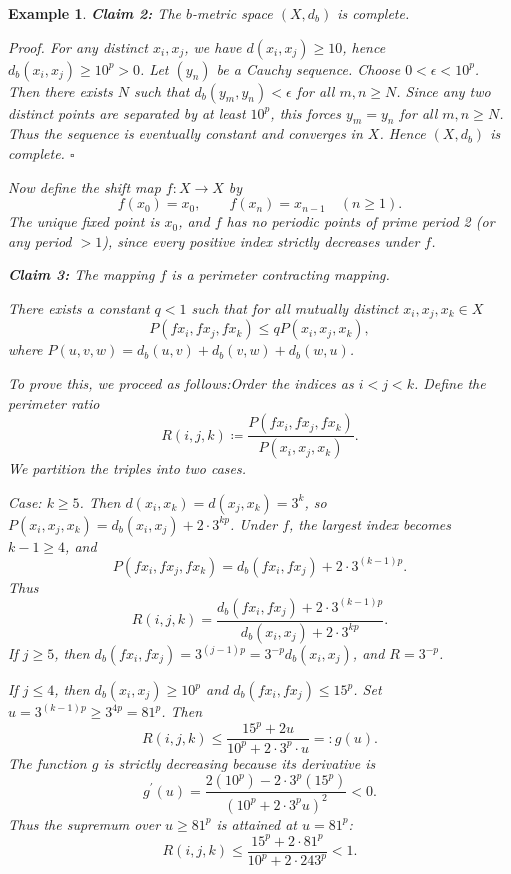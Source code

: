 \documentclass[a4paper,12pt,oneside]{article}
\newtheorem{example}[theorem]{Example}
\numberwithin{equation}{section}
\begin{document}
\begin{example}
\noindent\textbf{Claim 2:} The $b$-metric space $(X,d_{b})$ is complete.

\textit{Proof.} For any distinct $x_{i},x_{j}$, we have $d(x_{i},x_{j})\geq 10$, hence $d_{b}(x_{i},x_{j})\geq 10^{p} > 0$. Let $(y_{n})$ be a Cauchy sequence. Choose $0< \epsilon < 10^{p}$. Then there exists $N$ such that $d_{b}(y_{m},y_{n})< \epsilon$ for all $m,n\geq N$. Since any two distinct points are separated by at least $10^{p}$, this forces $y_{m} = y_{n}$ for all $m,n\geq N$. Thus the sequence is eventually constant and converges in $X$. Hence $(X,d_{b})$ is complete. $\square$

Now define the shift map $f:X\to X$ by
\[
f(x_0) = x_0,\qquad f(x_n) = x_{n - 1}\quad (n\geq 1).
\]
The unique fixed point is $x_{0}$, and $f$ has no periodic points of prime period 2 (or any period $>1$), since every positive index strictly decreases under $f$.

\noindent\textbf{Claim 3:} The mapping $f$ is a perimeter contracting mapping.

There exists a constant $q<1$ such that for all mutually distinct $x_{i},x_{j},x_{k}\in X$
\[
P(fx_{i},fx_{j},fx_{k})\leq qP(x_{i},x_{j},x_{k}),
\]
where $P(u,v,w) = d_{b}(u,v) + d_{b}(v,w) + d_{b}(w,u)$.

To prove this, we proceed as follows:\newline Order the indices as $i< j< k$. Define the perimeter ratio
\[
R(i,j,k)\coloneqq \frac{P(fx_{i},fx_{j},fx_{k})}{P(x_{i},x_{j},x_{k})}.
\]
We partition the triples into two cases.

Case: $k\geq 5$. Then $d(x_{i},x_{k}) = d(x_{j},x_{k}) = 3^{k}$, so $P(x_{i},x_{j},x_{k}) = d_{b}(x_{i},x_{j}) + 2\cdot 3^{k p}$. Under $f$, the largest index becomes $k - 1\geq 4$, and
\[
P(fx_{i},fx_{j},fx_{k}) = d_{b}(fx_{i},fx_{j}) + 2\cdot 3^{(k - 1)p}.
\]
Thus
\[
R(i,j,k) = \frac{d_{b}(fx_{i},fx_{j}) + 2\cdot 3^{(k - 1)p}}{d_{b}(x_{i},x_{j}) + 2\cdot 3^{kp}}.
\]
If $j\geq 5$, then $d_{b}(fx_{i},fx_{j}) = 3^{(j - 1)p} = 3^{- p}d_{b}(x_{i},x_{j})$, and $R = 3^{- p}$.

If $j\leq 4$, then $d_{b}(x_{i},x_{j})\geq 10^{p}$ and $d_{b}(fx_{i},fx_{j})\leq 15^{p}$. Set $u = 3^{(k - 1)p}\geq 3^{4p} = 81^{p}$. Then
\[
R(i,j,k)\leq \frac{15^{p} + 2u}{10^{p} + 2\cdot 3^{p}\cdot u} =: g(u).
\]
The function $g$ is strictly decreasing because its derivative is
\[
g^{\prime}(u) = \frac{2(10^{p}) - 2\cdot 3^{p}(15^{p})}{(10^{p} + 2\cdot 3^{p}u)^{2}} < 0.
\]
Thus the supremum over $u\geq 81^{p}$ is attained at $u = 81^{p}$:
\[
R(i,j,k)\leq \frac{15^{p} + 2\cdot 81^{p}}{10^{p} + 2\cdot 243^{p}} < 1.
\]


\end{example}
\end{document}
